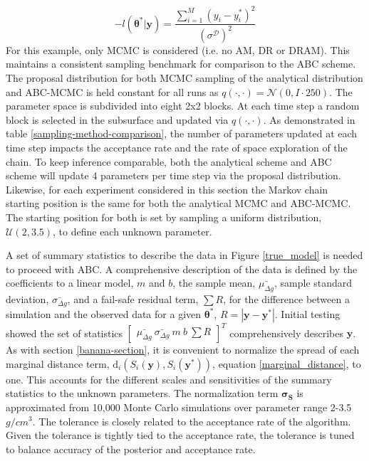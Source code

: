 \begin{equation}
	-l(\bm{\theta^*}|\bm{y}) = \frac{\sum_{i = 1}^{M}(y_i-y^*_i)^2}{(\sigma^{\mathcal{D}})^2}
	\label{analytical-applied-likelihood}
\end{equation}
For this example, only MCMC is considered (i.e. no AM, DR or DRAM). This maintains a consistent sampling benchmark for comparison to the ABC scheme. The proposal distribution for both MCMC sampling of the analytical distribution and ABC-MCMC is held constant for all runs as $q(\cdot,\cdot) = \mathcal{N}(0,I\cdot250)$. The parameter space is subdivided into eight 2x2 blocks. At each time step a random block is selected in the subsurface and updated via $q(\cdot,\cdot)$. As demonstrated in table \ref{sampling-method-comparison}, the number of parameters updated at each time step impacts the acceptance rate and the rate of space exploration of the chain. To keep inference comparable, both the analytical scheme and ABC scheme will update 4 parameters per time step via the proposal distribution. Likewise, for each experiment considered in this section the Markov chain starting position is the same for both the analytical MCMC and ABC-MCMC. The starting position for both is set by sampling a uniform distribution, $\mathcal{U}(2,3.5)$, to define each unknown parameter. \par

A set of summary statistics to describe the data in Figure \ref{true_model} is needed to proceed with ABC. A comprehensive description of the data is defined by the coefficients to a linear model, $m$ and $b$, the sample mean, $\bar{\mu_{\Delta g}}$, sample standard deviation, $\bar{\sigma_{\Delta g}}$, and a fail-safe residual term, $\sum R$, for the difference between a simulation and the observed data for a given $\bm{\theta^*}$, $R = |\bm{y}-\bm{y^*}|$. Initial testing showed the set of statistics $\begin{bmatrix}
\bar{\mu_{\Delta g}}\ \bar{\sigma_{\Delta g}}\ m\ b\ \sum R
\end{bmatrix}^T$ comprehensively describes $\bm{y}$. As with section \ref{banana-section}, it is convenient to normalize the spread of each marginal distance term, $\text{d}_i(S_i(\bm{y}),S_i(\bm{y^*}))$, equation \ref{marginal_distance}, to one. This accounts for the different scales and sensitivities of the summary statistics to the unknown parameters. The normalization term $\bm{\sigma_S}$ is approximated from 10,000 Monte Carlo simulations over parameter range 2-3.5 $g/cm^3$. The tolerance is closely related to the acceptance rate of the algorithm. Given the tolerance is tightly tied to the acceptance rate, the tolerance is tuned to balance accuracy of the posterior and acceptance rate.\par

